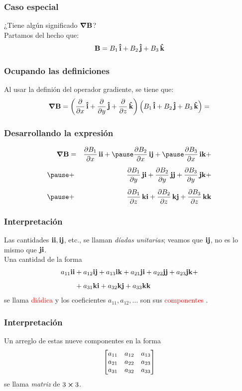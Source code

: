 \documentclass[12pt]{beamer}
\begin{document}
\begin{frame}
\frametitle{Caso especial}
¿Tiene algún significado $\grad{\vb{B}}$?
\\
\bigskip
\pause
Partamos del hecho que:
\begin{align*}
\vb{B} = B_{1} \, \vu{i} + B_{2} \, \vu{j} + B_{3} \, \vu{k}
\end{align*}
\end{frame}
\begin{frame}
\frametitle{Ocupando las definiciones}
Al usar la definión del operador gradiente, se tiene que:
\begin{align*}
\grad{\vb{B}} = \left( \pdv{x} \, \vu{i} + \pdv{y} \, \vu{j} + \pdv{z} \, \vu{k} \right) \left( B_{1} \, \vu{i} + B_{2} \, \vu{j} + B_{3} \, \vu{k} \right) = 
\end{align*}
\end{frame}
\begin{frame}
\frametitle{Desarrollando la expresión}
\begin{eqnarray*}
\grad{\vb{B}} &=& \pdv{B_{1}}{x} \, \vb{ii} + \pause \pdv{B_{2}}{x} \, \vb{ij} + \pause \pdv{B_{3}}{x} \, \vb{ik} + \\[0.5em] \pause
&+& \pdv{B_{1}}{y} \, \vb{ji} + \pdv{B_{2}}{y} \, \vb{jj} + \pdv{B_{3}}{y} \, \vb{jk} + \\[0.5em]\pause
&+& \pdv{B_{1}}{z} \, \vb{ki} + \pdv{B_{2}}{z} \, \vb{kj} + \pdv{B_{3}}{z} \, \vb{kk}
\end{eqnarray*}
\end{frame}
\begin{frame}
\frametitle{Interpretación}
Las cantidades $\vb{ii}, \vb{ij}$, etc., se llaman \emph{díadas unitarias}; veamos que $\vb{ij}$, no es lo mismo que $\vb{ji}$.
\\
\bigskip
\pause
Una cantidad de la forma
\begin{align*}
a_{11} \vb{ii} &+ a_{12} \vb{ij} + a_{13} \vb{ik} + a_{21} \vb{ji} + a_{22} \vb{jj} + a_{23} \vb{jk} + \\[0.5em]
&+ a_{31} \vb{ki} + a_{32} \vb{kj} + a_{33} \vb{kk}
\end{align*}
se llama \textcolor{red}{diádica} y los coeficientes $a_{11}, a_{12}, \ldots$ son sus \textcolor{red}{componentes}
.
\end{frame}
\begin{frame}
\frametitle{Interpretación}
Un arreglo de estas nueve componentes en la forma
\begin{align*}
\mqty[
a_{11} & a_{12} & a_{13} \\
a_{21} & a_{22} & a_{23} \\
a_{31} & a_{32} & a_{33} \\
]
\end{align*}
se llama \emph{matriz} de $3 \cp 3$.
\end{frame}
\end{document}
